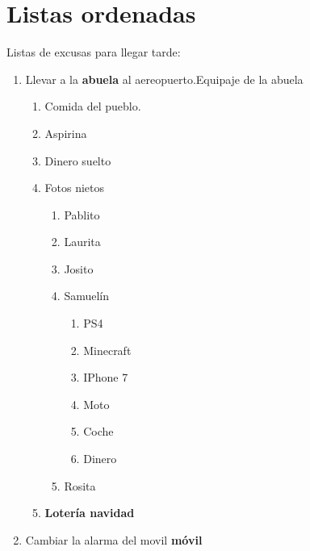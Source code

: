 \documentclass[10pt,a4paper]{article}
\begin{document}
 \section{Listas ordenadas}
 Listas de excusas para llegar tarde:
  \begin{enumerate}
   \item Llevar a la {\bf abuela} al aereopuerto.Equipaje de la abuela
    \begin{enumerate}
     \item Comida del pueblo.
     \item Aspirina
     \item Dinero suelto
     \item Fotos nietos
      \begin{enumerate}
       \item Pablito
       \item Laurita
       \item Josito
       \item Samuelín
        \begin{enumerate}
         \item PS4
         \item Minecraft
         \item IPhone 7
         \item Moto
         \item Coche
         \item Dinero
        \end{enumerate}
       \item Rosita
      \end{enumerate}
     \item {\bf Lotería navidad}
	\end{enumerate}
   \item Cambiar la alarma del movil {\bf móvil}
  \end{enumerate}
\end{document}
